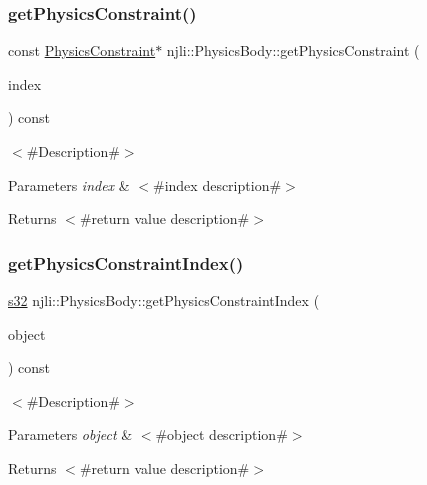 \subsubsection{\texorpdfstring{get\+Physics\+Constraint()}{getPhysicsConstraint()}\hspace{0.1cm}{\footnotesize\ttfamily [2/2]}}
{\footnotesize\ttfamily const \mbox{\hyperlink{classnjli_1_1_physics_constraint}{Physics\+Constraint}}$\ast$ njli\+::\+Physics\+Body\+::get\+Physics\+Constraint (\begin{DoxyParamCaption}\item[{const \mbox{\hyperlink{_util_8h_a10e94b422ef0c20dcdec20d31a1f5049}{u32}}}]{index }\end{DoxyParamCaption}) const}

$<$\#\+Description\#$>$


\begin{DoxyParams}{Parameters}
{\em index} & $<$\#index description\#$>$\\
\hline
\end{DoxyParams}
\begin{DoxyReturn}{Returns}
$<$\#return value description\#$>$ 
\end{DoxyReturn}
\mbox{\label{classnjli_1_1_physics_body_af17e37b5161cf45c98fb07607ec27eb6}} 
\subsubsection{\texorpdfstring{get\+Physics\+Constraint\+Index()}{getPhysicsConstraintIndex()}}
{\footnotesize\ttfamily \mbox{\hyperlink{_util_8h_aa62c75d314a0d1f37f79c4b73b2292e2}{s32}} njli\+::\+Physics\+Body\+::get\+Physics\+Constraint\+Index (\begin{DoxyParamCaption}\item[{\mbox{\hyperlink{classnjli_1_1_physics_constraint}{Physics\+Constraint}} $\ast$}]{object }\end{DoxyParamCaption}) const}

$<$\#\+Description\#$>$


\begin{DoxyParams}{Parameters}
{\em object} & $<$\#object description\#$>$\\
\hline
\end{DoxyParams}
\begin{DoxyReturn}{Returns}
$<$\#return value description\#$>$ 
\end{DoxyReturn}
\mbox{\label{classnjli_1_1_physics_body_a62a572e1c500a90ade8e279d72664123}} 
